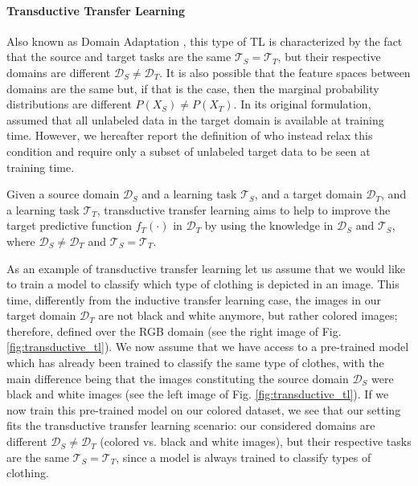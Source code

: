 \paragraph{\textbf{\uppercase{T}ransductive \uppercase{T}ransfer \uppercase{L}earning}}
Also known as Domain Adaptation \cite{arnold2007comparative}, this type of TL is characterized by the fact that the source and target tasks are the same $\mathcal{T}_S = \mathcal{T}_T$, but their respective domains are different $\mathcal{D}_S \neq \mathcal{D}_T$. It is also possible that the feature spaces between domains are the same but, if that is the case, then the marginal probability distributions are different $P(X_S)\neq P(X_T)$. In its original formulation, \citet{arnold2007comparative} assumed that all unlabeled data in the target domain is available at training time. However, we hereafter report the definition of \citet{pan2009survey} who instead relax this condition and require only a subset of unlabeled target data to be seen at training time.
\begin{definition}
	Given a source domain $\mathcal{D}_S$ and a learning task $\mathcal{T}_S$, and a target domain $\mathcal{D}_T$, and a learning task $\mathcal{T}_T$, transductive transfer learning aims to help to improve the target predictive function $f_T(\cdot)$ in $\mathcal{D}_T$ by using the knowledge in $\mathcal{D}_S$ and $\mathcal{T}_S$, where $\mathcal{D}_S \neq \mathcal{D}_T$ and $\mathcal{T}_S = \mathcal{T}_T$. 
\end{definition}
As an example of transductive transfer learning let us assume that we would like to train a model to classify which type of clothing is depicted in an image. This time, differently from the inductive transfer learning case, the images in our target domain $\mathcal{D}_T$ are not black and white anymore, but rather colored images; therefore, defined over the RGB domain (see the right image of Fig. \ref{fig:transductive_tl}). We now assume that we have access to a pre-trained model which has already been trained to classify the same type of clothes, with the main difference being that the images constituting the source domain $\mathcal{D}_S$ were black and white images (see the left image of Fig. \ref{fig:transductive_tl}). If we now train this pre-trained model on our colored dataset, we see that our setting fits the transductive transfer learning scenario: our considered domains are different $\mathcal{D}_S \neq \mathcal{D}_T$ (colored vs. black and white images), but their respective tasks are the same  $\mathcal{T}_S = \mathcal{T}_T$, since a model is always trained to classify types of clothing.

